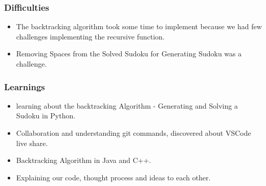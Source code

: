 \documentclass{beamer}
\begin{document}
\begin{frame}
     \frametitle{Difficulties}
     \begin{itemize}
          \item The backtracking algorithm took some time to implement because we had few challenges implementing the recursive function.
		  \item Removing Spaces from the Solved Sudoku for Generating Sudoku was a challenge. 
\end{itemize}
\end{frame}

\begin{frame}
     \frametitle{Learnings}
     \begin{itemize}
     \item learning about the backtracking Algorithm -  Generating and Solving a Sudoku in Python.
     \item Collaboration and understanding git commands, discovered about VSCode live share.
	 \item Backtracking Algorithm in Java and C++.
	 \item Explaining our code, thought process and ideas to each other.
\end{itemize}         
\end{frame}
\end{document}

